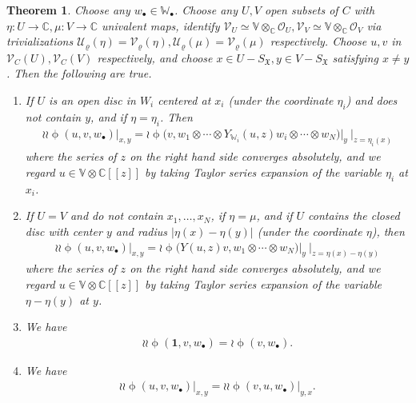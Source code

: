 \documentclass[12pt,a4paper,notitlepage]{report}
\theoremstyle{definition}
\theoremstyle{plain}
\newtheorem{thm}[df]{Theorem}
\newcommand{\fk}{\mathfrak}
\newcommand{\mc}{\mathcal}
\newcommand{\id}{\mathbf{1}}
\newcommand{\scr}{\mathscr}
\newcommand{\blt}{\bullet}
\newcommand{\Vbb}{\mathbb V}
\newcommand{\Wbb}{\mathbb W}
\newcommand{\Cbb}{\mathbb C}
\numberwithin{equation}{section}
\begin{document}
\begin{thm}\label{lb48}
Choose  any $w_\blt\in\Wbb_\blt$. Choose any $U,V$ open subsets of $C$ with $\eta:U\rightarrow\Cbb,\mu:V\rightarrow\Cbb$ univalent maps,  identify $\scr V_U\simeq \Vbb\otimes_\Cbb\scr O_U,\scr V_V\simeq \Vbb\otimes_\Cbb\scr O_V$ via trivializations $\mc U_\varrho(\eta)=\mc V_\varrho(\eta),\mc U_\varrho(\mu)=\mc V_\varrho(\mu)$ respectively. Choose $u,v$   in $\scr V_C(U),\scr V_C(V)$ respectively, and choose $x\in U-S_{\fk X},y\in V-S_{\fk X}$ satisfying $x\neq y$. Then the following are true.
\begin{enumerate}[label=(\arabic*)]
\item If $U$ is an open disc in $W_i$ centered at $x_i$ (under the coordinate $\eta_i$) and does not contain $y$, and if $\eta=\eta_i$. Then
\begin{align}
\wr\wr\upphi(u,v,w_\blt)\big|_{x,y}=\wr\upphi\big(v,w_1\otimes\cdots\otimes Y_{\Wbb_i}(u,z)w_i\otimes\cdots\otimes w_N\big)\big|_y~\big|_{z=\eta_i(x)}
\end{align}
where the series of $z$ on the right hand side converges absolutely, and we regard $u\in\Vbb\otimes\Cbb[[z]]$ by taking Taylor series expansion of the variable $\eta_i$ at $x_i$.
\item If $U=V$ and do not contain $x_1,\dots,x_N$, if $\eta=\mu$, and if $U$ contains the closed disc with center $y$ and radius $|\eta(x)-\eta(y)|$ (under the coordinate $\eta$), then
\begin{align}
\wr\wr\upphi(u,v,w_\blt)\big|_{x,y}=\wr\upphi\big(Y(u,z)v,w_1\otimes\cdots\otimes w_N\big)\big |_y~\big |_{z=\eta(x)-\eta(y)}
\end{align}
where the series of $z$ on the right hand side converges absolutely, and we regard $u\in\Vbb\otimes\Cbb[[z]]$ by taking Taylor series expansion of the variable $\eta-\eta(y)$ at $y$.
\item  We have
\begin{align}
\wr\wr\upphi(\id,v,w_\blt)=\wr\upphi(v,w_\blt).
\end{align}
\item We have
\begin{align}
\wr\wr\upphi(u,v,w_\blt)\big|_{x,y}=\wr\wr\upphi(v,u,w_\blt)\big|_{y,x}.
\end{align}
\end{enumerate}
\end{thm}
\end{document}
